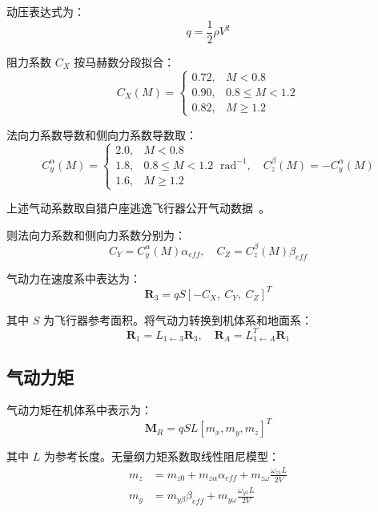 动压表达式为：
\begin{equation}
q=\frac{1}{2}\rho V^2 
\end{equation}

阻力系数 $C_X$ 按马赫数分段拟合：
\begin{equation}
C_X(M)=
\begin{cases}
0.72, & M<0.8 \\
0.90, & 0.8\le M<1.2 \\
0.82, & M\ge 1.2
\end{cases}
\end{equation}

法向力系数导数和侧向力系数导数取：
\begin{equation}
C_y^{\alpha}(M)=
\begin{cases}
2.0, & M<0.8 \\
1.8, & 0.8\le M<1.2 \\
1.6, & M\ge1.2
\end{cases}\ \mathrm{rad^{-1}},\quad
C_z^{\beta}(M)=-C_y^{\alpha}(M)
\end{equation}

上述气动系数取自猎户座逃逸飞行器公开气动数据~\cite{chan2011modeling}。

则法向力系数和侧向力系数分别为：
\begin{equation}
C_Y=C_y^{\alpha}(M)\alpha_{eff},\quad
C_Z=C_z^{\beta}(M)\beta_{eff} 
\end{equation}

气动力在速度系中表达为：
\begin{equation}
\mathbf R_3=qS[-C_X,\ C_Y,\ C_Z]^T 
\end{equation}

其中 $S$ 为飞行器参考面积。将气动力转换到机体系和地面系：
\begin{equation}
\mathbf R_1=L_{1\leftarrow 3}\mathbf R_3,\quad
\mathbf R_A=L_{1\leftarrow A}^T\mathbf R_1 
\end{equation}

\subsection{气动力矩}

气动力矩在机体系中表示为：
\begin{equation}
\mathbf M_R=qSL[m_x,m_y,m_z]^T 
\end{equation}

其中 $L$ 为参考长度。无量纲力矩系数取线性阻尼模型：
\begin{equation}
\begin{aligned}
m_z &= m_{z0}+m_{z\alpha}\alpha_{eff}+m_{z\omega}\frac{\omega_{z1}L}{2V} \\[4pt]
m_y &= m_{y\beta}\beta_{eff}+m_{y\omega}\frac{\omega_{y1}L}{2V}
\end{aligned}
\end{equation}

